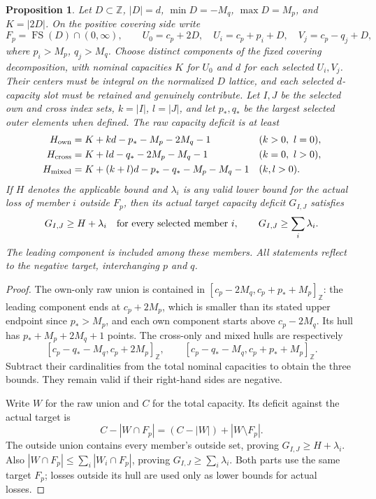 \documentclass[11pt,a4paper]{article}
\newtheorem{proposition}[theorem]{Proposition}
\theoremstyle{remark}
\newcommand{\FS}{\operatorname{FS}}
\newcommand{\Z}{\mathbb Z}
\begin{document}
\begin{proposition}\label{u86:prop:fullDgroups}
Let $D\subset\Z$, $|D|=d$, $\min D=-M_q$, $\max D=M_p$, and
$K=|2D|$. On the positive covering side write
\[
 F_p=\FS(D)\cap(0,\infty),\qquad
 U_0=c_p+2D,\quad U_i=c_p+p_i+D,\quad V_j=c_p-q_j+D,
\]
where $p_i>M_p$, $q_j>M_q$. Choose distinct components of the fixed
covering decomposition, with nominal capacities $K$ for $U_0$ and $d$
for each selected $U_i,V_j$. Their centers must be integral on the
normalized $D$ lattice, and each selected $d$-capacity slot must be
retained and genuinely contribute. Let $I,J$ be the selected own and
cross index sets, $k=|I|$, $l=|J|$, and let $p_*,q_*$ be the largest
selected outer elements when defined. The raw capacity deficit is at least
\begin{align*}
 H_{\rm own}&=K+kd-p_*-M_p-2M_q-1 &&(k>0,\ l=0),\\
 H_{\rm cross}&=K+ld-q_*-2M_p-M_q-1 &&(k=0,\ l>0),\\
 H_{\rm mixed}&=K+(k+l)d-p_*-q_*-M_p-M_q-1 &&(k,l>0).
\end{align*}
If $H$ denotes the applicable bound and $\lambda_i$ is any valid lower
bound for the actual loss of member $i$ outside $F_p$, then its actual
target capacity deficit $G_{I,J}$ satisfies
\[
 G_{I,J}\ge H+\lambda_i\quad\hbox{for every selected member }i,
 \qquad G_{I,J}\ge\sum_i\lambda_i.
\]
The leading component is included among these members. All statements
reflect to the negative target, interchanging $p$ and $q$.
\end{proposition}
\begin{proof}
The own-only raw union is contained in
$[c_p-2M_q,c_p+p_*+M_p]_{\Z}$: the leading component ends at
$c_p+2M_p$, which is smaller than its stated upper endpoint since
$p_*>M_p$, and each own component starts above $c_p-2M_q$.
Its hull has $p_*+M_p+2M_q+1$ points. The cross-only and mixed
hulls are respectively
\[
 [c_p-q_*-M_q,c_p+2M_p]_{\Z},\qquad
 [c_p-q_*-M_q,c_p+p_*+M_p]_{\Z}.
\]
Subtract their cardinalities from the total nominal capacities to obtain
the three bounds. They remain valid if their right-hand sides are negative.

Write $W$ for the raw union and $C$ for the total capacity. Its deficit
against the actual target is
\[
 C-|W\cap F_p|=(C-|W|)+|W\setminus F_p|.
\]
The outside union contains every member's outside set, proving
$G_{I,J}\ge H+\lambda_i$. Also
$|W\cap F_p|\le\sum_i|W_i\cap F_p|$, proving
$G_{I,J}\ge\sum_i\lambda_i$. Both parts use the same target $F_p$;
losses outside its hull are used only as lower bounds for actual losses.
\end{proof}
\end{document}
